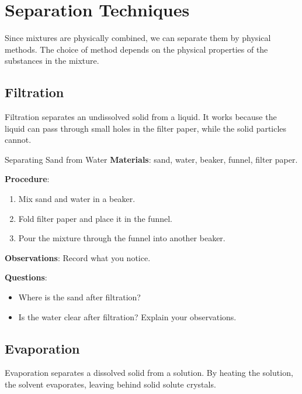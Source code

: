 \section{Separation Techniques}

Since mixtures are physically combined, we can separate them by physical methods. The choice of method depends on the physical properties of the substances in the mixture.

\subsection{Filtration}

\begin{keyconcept}{Filtration}
 separates an undissolved solid from a liquid. It works because the liquid can pass through small holes in the filter paper, while the solid particles cannot.
\end{keyconcept}


\begin{investigation}{Separating Sand from Water}
\textbf{Materials}: sand, water, beaker, funnel, filter paper.

\textbf{Procedure}:
\begin{enumerate}
\item Mix sand and water in a beaker.
\item Fold filter paper and place it in the funnel.
\item Pour the mixture through the funnel into another beaker.
\end{enumerate}

\textbf{Observations}: Record what you notice.

\textbf{Questions}:
\begin{itemize}
\item Where is the sand after filtration?
\item Is the water clear after filtration? Explain your observations.
\end{itemize}
\end{investigation}

\subsection{Evaporation}

\begin{keyconcept}{Evaporation}
 separates a dissolved solid from a solution. By heating the solution, the solvent evaporates, leaving behind solid solute crystals.
\end{keyconcept}

